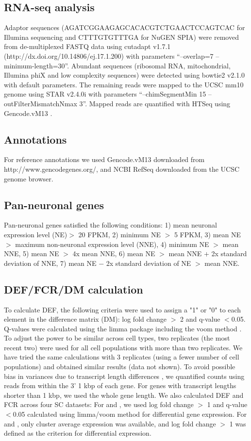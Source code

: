 \subsection{RNA-seq analysis}
Adaptor sequences (AGATCGGAAGAGCACACGTCTGAACTCCAGTCAC for Illumina sequencing and CTTTGTGTTTGA for NuGEN SPIA) were removed from de-multiplexed FASTQ data using cutadapt v1.7.1 (http://dx.doi.org/10.14806/ej.17.1.200) with parameters “--overlap=7 --minimum-length=30”. Abundant sequences (ribosomal RNA, mitochondrial, Illumina phiX and low complexity sequences) were detected using bowtie2 \citep{Langmead_2012} v2.1.0 with default parameters. The remaining reads were mapped to the UCSC mm10 genome using STAR \citep{Dobin_2012} v2.4.0i with parameters “--chimSegmentMin 15 --outFilterMismatchNmax 3”. Mapped reads are quantified with HTSeq \citep{Anders_2014} using Gencode.vM13 \citep{Harrow_2012}.

\subsection{Annotations}
For reference annotations we used Gencode.vM13 \citep{Harrow_2012} downloaded from http://www.gencodegenes.org/, and NCBI RefSeq \citep{Pruitt_2013} downloaded from the UCSC genome browser.

\subsection{Pan-neuronal genes}
Pan-neuronal genes satisfied the following conditions: 1) mean neuronal expression level (NE)$>$ 20 FPKM, 2) minimum NE $>$ 5 FPKM, 3) mean NE $>$ maximum non-neuronal expression level (NNE), 4) minimum NE $>$ mean NNE, 5) mean NE $>$ 4x mean NNE, 6) mean NE $>$ mean NNE $+$ 2x standard deviation of NNE, 7) mean NE $-$ 2x standard deviation of NE $>$ mean NNE. 

\subsection{DEF/FCR/DM calculation}
To calculate DEF, the following criteria were used to assign a "1" or "0" to each element in the difference matrix (DM): log fold change $>$ 2 and q-value $<$0.05. Q-values were calculated using the limma package including the voom method \citep{Law_2014}. To adjust the power to be similar across cell types, two replicates (the most recent two) were used for all cell populations with more than two replicates. We have tried the same calculations with 3 replicates (using a fewer number of cell populations) and obtained similar results (data not shown). To avoid possible bias in variances due to transcript length differences \citep{Oshlack_2009}, we quantified counts using reads from within the 3' 1 kbp of each gene. For genes with transcript lengths shorter than 1 kbp, we used the whole gene length. 
We also calculated DEF and FCR across four SC datasets: For \cite{Zeisel_2015} and \cite{Tasic_2016}, we used log fold change $>$ 1 and q-value $<$0.05 calculated using limma/voom method for differential gene expression. For \cite{Saunders_2018} and \cite{Zeisel_2018}, only cluster average expression was available, and log fold change $>$ 1 was defined as the criterion for differential expression.

